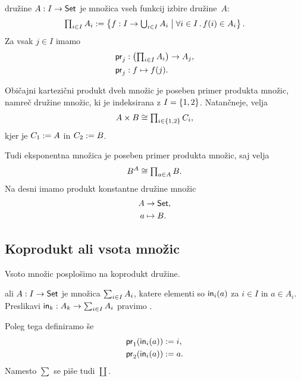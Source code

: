 \begin{definicija}
  \label{def:produkt-druzine}
   družine $A : I \to \Set$ je množica vseh funkcij izbire družine~$A$:
  \begin{equation*}
    \Prod{i \in I} A_i \defeq
    \set{f : I \to \Union{i \in I} A_i \such \all{i \in I} f(i) \in A_i}.
  \end{equation*}
  Za vsak $j \in I$ imamo 
  \begin{align*}
    \pr[j] &:  \left(\Prod{i \in I} A_i\right) \to A_j, \\
    \pr[j] &:  f \mapsto f(j).
  \end{align*}
\end{definicija}

Običajni kartezični produkt dveh množic je poseben primer produkta množic, namreč družine
množic, ki je indeksirana z $I = \set{1, 2}$. Natančneje, velja
%
\begin{equation*}
  A \times B \cong \Prod{i \in \set{1, 2}} C_i,
\end{equation*}
%
kjer je $C_1 \defeq A$ in $C_2 \defeq B$.

Tudi eksponentna množica je poseben primer produkta množic, saj velja
%
\begin{equation*}
  B^A \cong \Prod{a \in A} B.
\end{equation*}
%
Na desni imamo produkt konstantne družine množic
%
\begin{align*}
  A &\to \Set, \\
  a &\mapsto B.
\end{align*}


\subsection{Koprodukt ali vsota množic}
\label{sec:koprodukt-druzine}

Vsoto množic posplošimo na koprodukt družine.

\begin{definicija}
  \label{def:koprodukt-druzine}
   ali  $A : I \to \Set$ je množica
  $\Sum{i \in I} A_i$, katere elementi so $\inj[i](a)$ za $i \in I$ in $a \in A_i$.
  Preslikavi $\inj[k] : A_k \to \Sum{i \in I} A_i$ pravimo .

  Poleg tega definiramo še 
  \begin{align*}
    \fst (\inj[i](a)) &\defeq i, \\
    \snd (\inj[i](a)) &\defeq a.
  \end{align*}
  Namesto $\sum$ se piše tudi $\coprod$.
\end{definicija}

